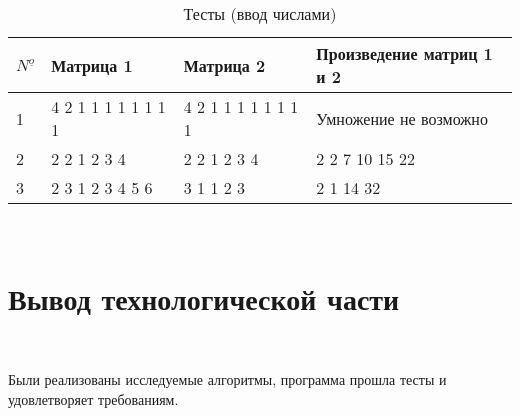 \begin{table}[ht]
    \caption{Тесты (ввод числами)}
\begin{tabular}{ l || l || l || l }
    ${N^{\underline{o}}}$ & Матрица 1 & Матрица 2 & Произведение матриц 1 и 2  \\ \hline \hline
    1 &
    4 2 1 1 1 1 1 1 1 1
    &
    4 2 1 1 1 1 1 1 1 1
    & Умножение не возможно
    \\  \hline \hline

    2 &
    2 2 1 2 3 4
    &
    2 2 1 2 3 4
    & 
    2 2 7 10 15 22
    \\  \hline \hline


    3 &
    2 3 1 2 3 4 5 6
    &
    3 1 1 2 3
    & 
    2 1 14 32
    \\  \hline \hline

\end{tabular}
\label{tab:matrixInputMultiply}
\end{table}


~\section{Вывод технологической части}\label{TechResults}~

Были реализованы исследуемые алгоритмы, программа прошла тесты и удовлетворяет требованиям.

